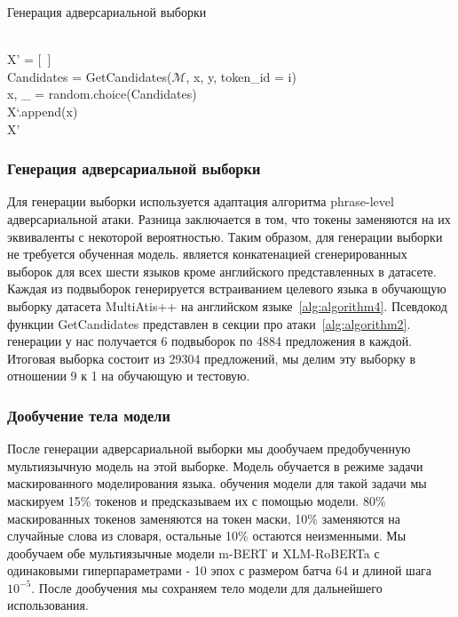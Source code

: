 \begin{algorithm}
    \caption{Генерация адверсариальной выборки}
    \begin{algorithmic}
         \\
        X' = [~]
                    \\
                    \ind\ind\ind Candidates = GetCandidates($\mathcal{M}$, x, y, token\_id = i)
                    \ind{}
                            \\
                            \ind\ind\ind\ind x, \_ = random.choice(Candidates)
                    \EndIf
                \EndFor \\
                \ind\ind X`.append(x)
            \EndFor
        \EndFor \\
        \Return X'
    \end{algorithmic}\label{alg:algorithm4}
\end{algorithm}

\subsubsection{Генерация адверсариальной выборки}
Для генерации выборки используется адаптация алгоритма phrase-level адверсариальной атаки.
Разница заключается в том, что токены заменяются на их эквиваленты с некоторой вероятностью.
Таким образом, для генерации выборки не требуется обученная модель.
 является конкатенацией сгенерированных выборок для всех шести языков кроме английского представленных в датасете.
Каждая из подвыборок генерируется встраиванием целевого языка в обучающую выборку датасета MultiAtis++ на английском языке~\eqref{alg:algorithm4}.
Псевдокод функции GetCandidates представлен в секции про атаки~\eqref{alg:algorithm2}.
 генерации у нас получается 6 подвыборок по 4884 предложения в каждой.
Итоговая выборка состоит из 29304 предложений, мы делим эту выборку в отношении 9 к 1 на обучающую и тестовую.

\subsubsection{Дообучение тела модели}
После генерации адверсариальной выборки мы дообучаем предобученную мультиязычную модель на этой выборке.
Модель обучается в режиме задачи маскированного моделирования языка.
 обучения модели для такой задачи мы маскируем 15\% токенов и предсказываем их с помощью модели.
80\% маскированных токенов заменяются на токен маски, 10\% заменяются на случайные слова из словаря, остальные 10\% остаются неизменными.
Мы дообучаем обе мультиязычные модели m-BERT и XLM-RoBERTa с одинаковыми гиперпараметрами - 10 эпох с размером батча 64 и длиной шага $10^{-5}$.
После дообучения мы сохраняем тело модели для дальнейшего использования.

